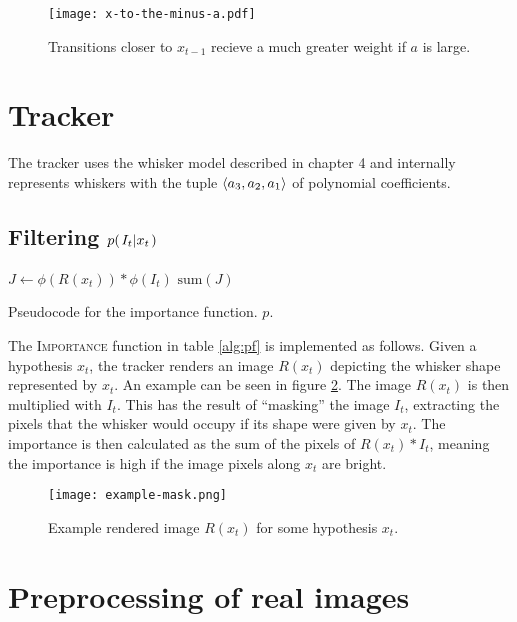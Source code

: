 \begin{figure}[ht]
  \centering
  \texttt{[image: x-to-the-minus-a.pdf]}
  \caption{Transitions closer to $x_{t-1}$ recieve a much greater
    weight if $a$ is large.}
  \label{fig:x-to-the-minus-a}
\end{figure}

\section{Tracker}

The tracker uses the whisker model described in chapter 4 and
internally represents whiskers with the tuple $\langle a_3, a_2, a_1 \rangle$ of polynomial
coefficients.

\subsection{Filtering $p{(\left. I_t \middle\vert x_t \right.)}$}

\begin{table}[h]
  \begin{codebox}
    \li $ J \gets \phi(R(x_t)) * \phi(I_t)$
    \li \Return $\mathrm{sum}(J)$
  \end{codebox}
  \caption{Pseudocode for the importance function. $p$.}
  \label{alg:importance}
\end{table}

The \textsc{Importance} function in table \ref{alg:pf} is implemented
as follows. Given a hypothesis $x_t$, the tracker renders an image
$R(x_t)$ depicting the whisker shape represented by $x_t$. An example
can be seen in figure \ref{fig:example-mask}. The image $R(x_t)$ is
then multiplied with $I_t$. This has the result of ``masking'' the
image $I_t$, extracting the pixels that the whisker would occupy if
its shape were given by $x_t$. The importance is then calculated as
the sum of the pixels of $R(x_t) * I_t$, meaning the importance is
high if the image pixels along $x_t$ are bright.

\begin{figure}[h]
  \centering
  \texttt{[image: example-mask.png]}
  \caption{Example rendered image $R(x_t)$ for some hypothesis $x_t$.}
  \label{fig:example-mask}
\end{figure}

\section{Preprocessing of real images}
\label{prep-real}

